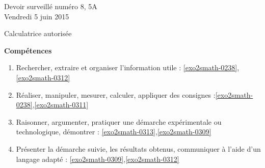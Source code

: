 \documentclass[a4paper,10pt]{article}
\begin{document}
\begin{feuilleDS}{Devoir surveillé numéro 8, 5A\\ \small Vendredi  5 juin 2015}
    \begin{center}
        Calculatrice autorisée
    \end{center}
\vspace{1cm}


{\bf Compétences}
\small
\begin{enumerate}
    \item
        Rechercher, extraire et organiser l'information utile : \ref{exo2smath-0238},\ref{exo2smath-0312}
    \item
        Réaliser, manipuler, mesurer, calculer, appliquer des consignes :\ref{exo2smath-0238},\ref{exo2smath-0311}
    \item
        Raisonner, argumenter, pratiquer une démarche expérimentale ou technologique, démontrer : \ref{exo2smath-0313},\ref{exo2smath-0309}
    \item 
        Présenter la démarche suivie, les résultats obtenus, communiquer à l'aide d’un langage adapté : \ref{exo2smath-0309},\ref{exo2smath-0312}
\end{enumerate}
\end{feuilleDS}
\end{document}
